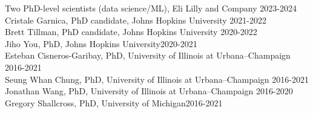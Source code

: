 Two PhD-level scientists (data science/ML), Eli Lilly and Company \hfill 2023-2024\vspace{1pt}\\
Cristale Garnica, PhD candidate, Johns Hopkins University \hfill 2021-2022\vspace{1pt}\\
Brett Tillman, PhD candidate, Johns Hopkins University \hfill 2020-2022\vspace{1pt}\\
Jiho You, PhD, Johns Hopkins University\hfill 2020-2021\vspace{1pt}\\
Esteban Cisneros-Garibay, PhD, University of Illinois at Urbana--Champaign \hfill 2016-2021\vspace{1pt}\\
Seung Whan Chung, PhD, University of Illinois at Urbana--Champaign \hfill 2016-2021\vspace{1pt}\\
Jonathan Wang, PhD, University of Illinois at Urbana--Champaign \hfill 2016-2020\vspace{1pt}\\
Gregory Shallcross, PhD, University of Michigan\hfill 2016-2021


